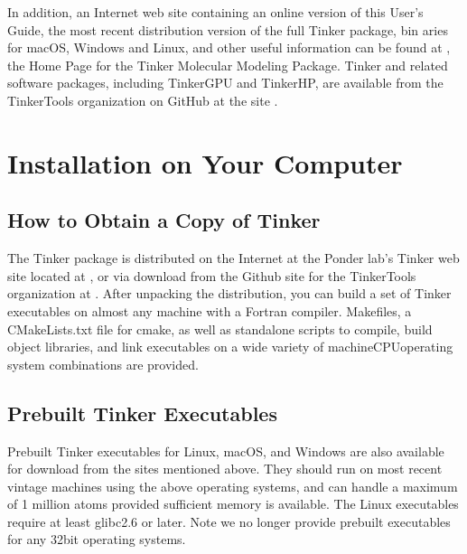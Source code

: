 \documentclass[letterpaper,11pt,english]{sphinxmanual}
\begin{document}
\sphinxAtStartPar
In addition, an Internet web site containing an online version of this User’s Guide, the most recent distribution version of the full Tinker package, bin aries for macOS, Windows and Linux, and other useful information can be found at , the Home Page for the Tinker Molecular Modeling Package. Tinker and related software packages, including Tinker\sphinxhyphen{}GPU and Tinker\sphinxhyphen{}HP, are available from the TinkerTools organization on GitHub at the site .

\sphinxstepscope


\chapter{Installation on Your Computer}
\label{\detokenize{text/installation:installation-on-your-computer}}\label{\detokenize{text/installation::doc}}

\section{How to Obtain a Copy of Tinker}
\label{\detokenize{text/installation:how-to-obtain-a-copy-of-tinker}}
\sphinxAtStartPar
The Tinker package is distributed on the Internet at the Ponder lab’s Tinker web site located at , or via download from the Github site for the TinkerTools organization at . After unpacking the distribution, you can build a set of Tinker executables on almost any machine with a Fortran compiler. Makefiles, a CMakeLists.txt file for cmake, as well as standalone scripts to compile, build object libraries, and link executables on a wide variety of machine\sphinxhyphen{}CPU\sphinxhyphen{}operating system combinations are provided.


\section{Prebuilt Tinker Executables}
\label{\detokenize{text/installation:prebuilt-tinker-executables}}
\sphinxAtStartPar
Pre\sphinxhyphen{}built Tinker executables for Linux, macOS, and Windows are also available for download from the sites mentioned above. They should run on most recent vintage machines using the above operating systems, and can handle a maximum of 1 million atoms provided sufficient memory is available. The Linux executables require at least glibc\sphinxhyphen{}2.6 or later. Note we no longer provide pre\sphinxhyphen{}built executables for any 32\sphinxhyphen{}bit operating systems.
\end{document}
